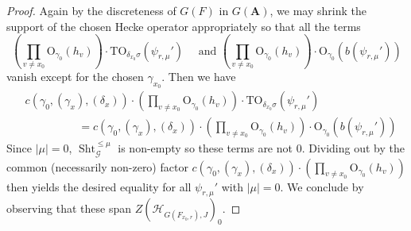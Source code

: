 \documentclass[reqno]{amsart}
\numberwithin{equation}{section}
\newcommand{\Cal}[1]{\mathcal{#1}}
\newcommand{\A}{\mathbf{A}}
\newcommand{\mrm}[1]{\mathrm{#1}}
\DeclareMathOperator{\Sht}{Sht}
\theoremstyle{remark}
\numberwithin{equation}{section}
\begin{document}
\begin{proof}
Again by the discreteness of $G(F)$ in $ G(\A)$, we may shrink the support of the chosen Hecke operator appropriately so that all the terms
\[
\left(\prod_{v \neq x_0} \mrm{O}_{\gamma_0 }(h_v) \right) \cdot   \mrm{TO}_{\delta_{x_0} \sigma}(\psi_{r,\mu}') \quad \text{ and } \left(\prod_{v \neq x_0} \mrm{O}_{\gamma_0}(h_v)\right) \cdot  \mrm{O}_{\gamma_0}(b(\psi_{r,\mu}'))
\]
vanish except for the chosen $\gamma_{x_0}$. Then we have 
\begin{align*}
&
c(\gamma_0, (\gamma_x), (\delta_x))   \cdot  \left(\prod_{v \neq x_0} \mrm{O}_{\gamma_0}(h_v) \right) \cdot   \mrm{TO}_{\delta_{x_0} \sigma}(\psi_{r,\mu}') \\
& \hspace{2cm} = 
c(\gamma_0, (\gamma_x), (\delta_x))   \cdot  \left(\prod_{v \neq x_0} \mrm{O}_{\gamma_0}(h_v)\right) \cdot  \mrm{O}_{\gamma_0}(b(\psi_{r,\mu}'))
\end{align*}
Since $|\mu|=0$, $\Sht_{\Cal{G}}^{\leq \mu}$ is non-empty so these terms are not $0$. Dividing out by the common (necessarily non-zero) factor $c(\gamma_0, (\gamma_x), (\delta_x))   \cdot  \left(\prod_{v \neq x_0} \mrm{O}_{\gamma_0}(h_v)\right)$ then yields the desired equality for all $\psi_{r, \mu}'$ with $|\mu|=0$. We conclude by observing that these span $ Z(\Cal{H}_{G(F_{x_0,r}),J})_0$. 
\end{proof}




\end{document}
